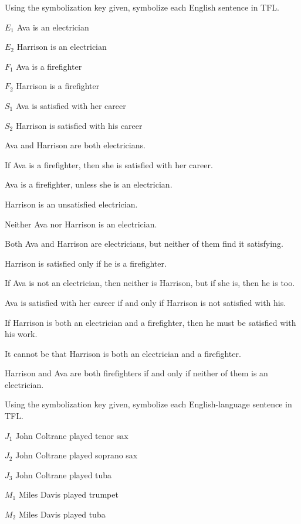 \problempart Using the symbolization key given, symbolize each English sentence in TFL.\label{pr.avacareer}
	\begin{ekey}
		\item[\ensuremath{E_1}] Ava is an electrician
		\item[\ensuremath{E_2}] Harrison is an electrician
		\item[\ensuremath{F_1}] Ava is a firefighter
		\item[\ensuremath{F_2}] Harrison is a firefighter
		\item[\ensuremath{S_1}] Ava is satisfied with her career
		\item[\ensuremath{S_2}] Harrison is satisfied with his career
	\end{ekey}
\begin{compactlist}
\item Ava and Harrison are both electricians.
\item If Ava is a firefighter, then she is satisfied with her career.
\item Ava is a firefighter, unless she is an electrician.
\item Harrison is an unsatisfied electrician.
\item Neither Ava nor Harrison is an electrician.
\item Both Ava and Harrison are electricians, but neither of them find it satisfying.
\item Harrison is satisfied only if he is a firefighter.
\item If Ava is not an electrician, then neither is Harrison, but if she is, then he is too.
\item Ava is satisfied with her career if and only if Harrison is not satisfied with his.
\item If Harrison is both an electrician and a firefighter, then he must be satisfied with his work.
\item It cannot be that Harrison is both an electrician and a firefighter.
\item Harrison and Ava are both firefighters if and only if neither of them is an electrician.
\end{compactlist}

\problempart
Using the symbolization key given, symbolize each English-language sentence in TFL.
\label{pr.jazzinstruments}
\begin{ekey}
\item[\ensuremath{J_1}] John Coltrane played tenor sax
\item[\ensuremath{J_2}] John Coltrane played soprano sax
\item[\ensuremath{J_3}] John Coltrane played tuba
\item[\ensuremath{M_1}] Miles Davis played trumpet
\item[\ensuremath{M_2}] Miles Davis played tuba
\end{ekey}

